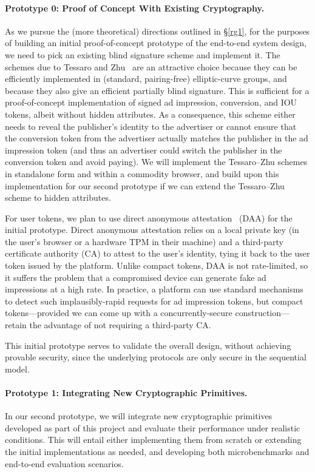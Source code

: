 \paragraph{Prototype 0: Proof of Concept With Existing Cryptography.}
%
As we pursue the (more theoretical) directions outlined in \S\ref{rg1}, for the purposes of building an initial proof-of-concept prototype of the end-to-end system design, we need to pick an existing blind signature scheme and implement it.
%
The schemes due to Tessaro and Zhu~\cite{EC:TesZhu22} are an attractive choice because they can be efficiently implemented in (standard, pairing-free) elliptic-curve groups, and because they also give an efficient partially blind signature.
%
This is sufficient for a proof-of-concept implementation of signed ad impression, conversion, and IOU tokens, albeit without hidden attributes.
%
As a consequence, this scheme either needs to reveal the publisher's identity to the advertiser or cannot ensure that the conversion token from the advertiser actually matches the publisher in the ad impression token (and thus an advertiser could switch the publisher in the conversion token and avoid paying).
%
We will implement the Tessaro--Zhu schemes in standalone form and within a commodity browser, and build upon this implementation for our second prototype if we can extend the Tessaro--Zhu scheme to hidden attributes.
%

%
For user tokens, we plan to use direct anonymous attestation~\cite{direct-anon-attest} (DAA) for the initial prototype.
%
Direct anonymous attestation relies on a local private key (in the user's browser or a hardware TPM in their machine) and a third-party certificate authority (CA) to attest to the user's identity, tying it back to the user token issued by the platform.
%
Unlike compact tokens, DAA is not rate-limited, so it suffers the problem that a compromised device can generate fake ad impressions at a high rate.
%
In practice, a platform can use standard mechanisms to detect such implausibly-rapid requests for ad impression tokens, but compact tokens---provided we can come up with a concurrently-secure construction---retain the advantage of not requiring a third-party CA.
%

%
This initial prototype serves to validate the overall design, without achieving provable security, since the underlying protocols are only secure in the sequential model.
%

\paragraph{Prototype 1: Integrating New Cryptographic Primitives.}
%
In our second prototype, we will integrate new cryptographic primitives developed as part of this project and evaluate their performance under realistic conditions.
%
This will entail either implementing them from scratch or extending the initial implementations as needed, and developing both microbenchmarks and end-to-end evaluation scenarios.
%

